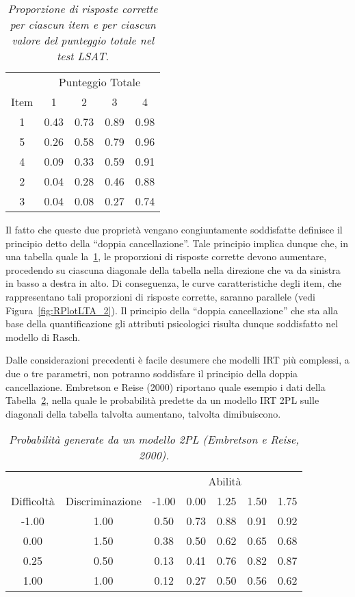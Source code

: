 \begin{table}
\centering
\begin{tabular}{ccccc}
\toprule
&\multicolumn{4}{c}{Punteggio Totale} \\
\cmidrule(r){2-5}
Item &  1  &   2 &   3  &  4 \\
\midrule
1 & 0.43 & 0.73 & 0.89 & 0.98\\
5 & 0.26 & 0.58&  0.79 & 0.96\\
4 & 0.09 & 0.33 & 0.59 & 0.91\\
2 & 0.04 & 0.28 & 0.46 & 0.88\\
3 & 0.04 & 0.08 & 0.27 & 0.74\\
\bottomrule
\end{tabular}
\caption{{\it Proporzione di risposte corrette per  ciascun item e per ciascun valore del punteggio totale nel test LSAT.} }
\label{tab_rasch60}
\end{table}

Il fatto che queste due proprietà vengano congiuntamente soddisfatte definisce il principio detto della ``doppia cancellazione''.  Tale principio implica dunque che, in una tabella quale la~\ref{tab_rasch60}, le  proporzioni di risposte corrette devono  aumentare, procedendo su ciascuna diagonale della tabella nella direzione che va da sinistra in basso a destra in alto. Di conseguenza, le curve caratteristiche degli item, che rappresentano tali proporzioni di risposte corrette, saranno parallele (vedi Figura~\ref{fig:RPlotLTA_2}).
Il principio della ``doppia cancellazione'' che sta alla base della quantificazione gli attributi psicologici risulta dunque soddisfatto nel modello di Rasch.

Dalle considerazioni precedenti è facile desumere che modelli IRT più complessi, a due o tre parametri, non potranno soddisfare il principio della doppia cancellazione.  Embretson e Reise (2000) riportano quale esempio i dati della Tabella~\ref{tab_embretson6.7}, nella quale le probabilità predette da un modello IRT 2PL sulle diagonali della tabella talvolta aumentano, talvolta dimibuiscono.  

\begin{table}
\centering
\begin{tabular}{ccccccc}
\toprule
\multicolumn{2}{c}{} &\multicolumn{5}{c}{Abilità} \\
\cmidrule(r){3-7}
Difficoltà &  Discriminazione  &  -1.00 &   0.00  &  1.25 & 1.50  & 1.75\\
\midrule
-1.00 & 1.00  & 0.50 & 0.73 & 0.88 & 0.91 & 0.92\\
0.00 & 1.50   & 0.38&  0.50 & 0.62 & 0.65 & 0.68\\
0.25 & 0.50   & 0.13 & 0.41 & 0.76 & 0.82 & 0.87\\
1.00 & 1.00   & 0.12 & 0.27 & 0.50 & 0.56 & 0.62\\
\bottomrule
\end{tabular}
\caption{{\it Probabilità generate da un modello 2PL (Embretson e Reise, 2000).} }
\label{tab_embretson6.7}
\end{table}

